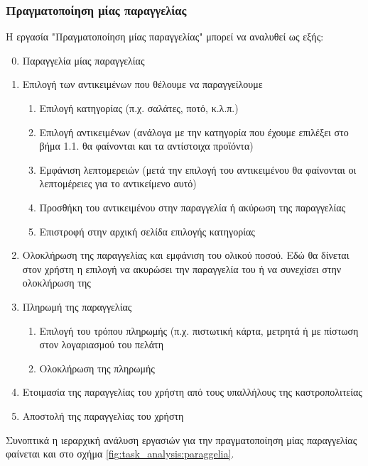 \documentclass{assignment}
\begin{document}
\subsubsection{Πραγματοποίηση μίας παραγγελίας}

Η εργασία "Πραγματοποίηση μίας παραγγελίας" μπορεί να αναλυθεί ως εξής:

\begin{enumerate}
\setcounter{enumi}{-1}
\item Παραγγελία μίας παραγγελίας
\item Επιλογή των αντικειμένων που θέλουμε να παραγγείλουμε
  \begin{enumerate}[label*=\arabic*.]
  \item Επιλογή κατηγορίας (π.χ. σαλάτες, ποτό, κ.λ.π.)
  \item Επιλογή αντικειμένων (ανάλογα με την κατηγορία που έχουμε επιλέξει στο βήμα 1.1. θα φαίνονται και τα αντίστοιχα προϊόντα)
  \item Εμφάνιση λεπτομερειών (μετά την επιλογή του αντικειμένου θα φαίνονται οι λεπτομέρειες για το αντικείμενο αυτό)
  \item Προσθήκη του αντικειμένου στην παραγγελία ή ακύρωση της παραγγελίας
  \item Επιστροφή στην αρχική σελίδα επιλογής κατηγορίας
  \end{enumerate}
\item Ολοκλήρωση της παραγγελίας και εμφάνιση του ολικού ποσού. Εδώ θα δίνεται στον χρήστη η επιλογή να ακυρώσει την παραγγελία του ή να συνεχίσει στην ολοκλήρωση της
\item Πληρωμή της παραγγελίας
  \begin{enumerate}[label*=\arabic*.]
  \item Επιλογή του τρόπου πληρωμής (π.χ. πιστωτική κάρτα, μετρητά ή με πίστωση στον λογαριασμού του πελάτη
  \item Ολοκλήρωση της πληρωμής
  \end{enumerate}
\item Ετοιμασία της παραγγελίας του χρήστη από τους υπαλλήλους της καστροπολιτείας
\item Αποστολή της παραγγελίας του χρήστη
\end{enumerate}

Συνοπτικά η ιεραρχική ανάλυση εργασιών για την πραγματοποίηση μίας παραγγελίας φαίνεται και στο σχήμα \ref{fig:task_analysis:paraggelia}.
\end{document}
